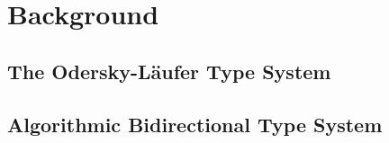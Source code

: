 \chapter{Background}
\label{chap:Background}

\section{The Odersky-L{\"a}ufer Type System}

\section{Algorithmic Bidirectional Type System}

